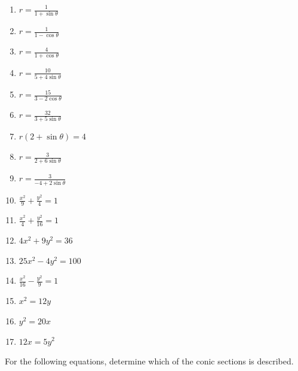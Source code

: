 \documentclass{exercises}
\begin{document}
\begin{enumerate}[resume]
\item $r=\frac{1}{1+\sin \theta}$
\item $r=\frac{1}{1-\cos \theta}$
\item $r=\frac{4}{1+\cos \theta}$
\item $r=\frac{10}{5+4\sin \theta}$
\item $r=\frac{15}{3-2\cos \theta}$
\item $r=\frac{32}{3+5\sin \theta}$
\item $r(2+\sin \theta)=4$
\item $r=\frac{3}{2+6\sin \theta}$
\item $r=\frac{3}{-4+2\sin \theta}$
\item $\frac{x^{2}}{9}+\frac{y^{2}}{4}=1$
\item $\frac{x^{2}}{4}+\frac{y^{2}}{16}=1$
\item $4x^{2}+9y^{2}=36$
\item $25x^{2}-4y^{2}=100$
\item $\frac{x^{2}}{16}-\frac{y^{2}}{9}=1$
\item $x^{2}=12y$
\item $y^{2}=20x$
\item $12x=5y^{2}$
\end{enumerate}

For the following equations, determine which of the conic sections is described.
\end{document}

